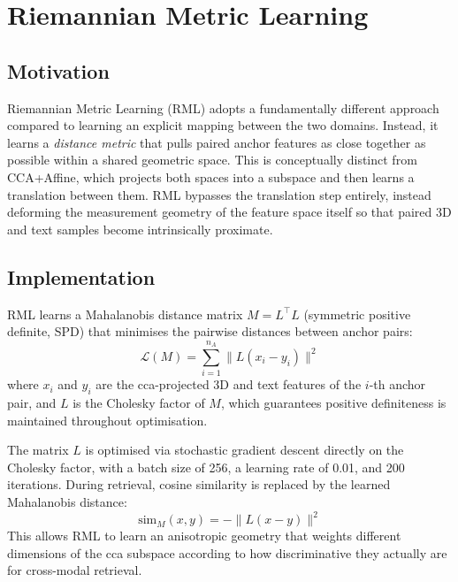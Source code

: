 \section{Riemannian Metric Learning}
\label{sec:rml}

\subsection{Motivation}
\label{subsec:rml_motivation}

Riemannian Metric Learning (RML) adopts a fundamentally different approach compared to learning an explicit mapping between the two domains. Instead, it learns a \emph{distance metric} that pulls paired anchor features as close together as possible within a shared geometric space. This is conceptually distinct from CCA+Affine, which projects both spaces into a subspace and then learns a translation between them. RML bypasses the translation step entirely, instead deforming the measurement geometry of the feature space itself so that paired 3D and text samples become intrinsically proximate.

\subsection{Implementation}
\label{subsec:rml_implementation}

RML learns a Mahalanobis distance matrix $M = L^\top L$ (symmetric positive definite, SPD) that minimises the pairwise distances between anchor pairs:
\begin{equation}
    \mathcal{L}(M) = \sum_{i=1}^{n_A} \|L(x_i - y_i)\|^2
    \label{eq:rml_loss}
\end{equation}
where $x_i$ and $y_i$ are the \gls{cca}-projected 3D and text features of the $i$-th anchor pair, and $L$ is the Cholesky factor of $M$, which guarantees positive definiteness is maintained throughout optimisation.

The matrix $L$ is optimised via stochastic gradient descent directly on the Cholesky factor, with a batch size of 256, a learning rate of 0.01, and 200 iterations. During retrieval, cosine similarity is replaced by the learned Mahalanobis distance:
\begin{equation}
    \text{sim}_M(x, y) = -\|L(x - y)\|^2
    \label{eq:mahalanobis_sim}
\end{equation}
This allows RML to learn an anisotropic geometry that weights different dimensions of the \gls{cca} subspace according to how discriminative they actually are for cross-modal retrieval.


